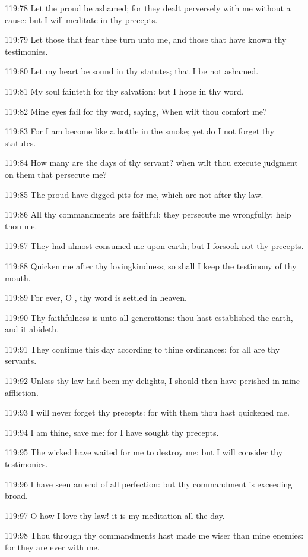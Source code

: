 119:78 Let the proud be ashamed; for they dealt perversely with me without a cause: but I will meditate in thy precepts.

119:79 Let those that fear thee turn unto me, and those that have known thy testimonies.

119:80 Let my heart be sound in thy statutes; that I be not ashamed.

119:81 My soul fainteth for thy salvation: but I hope in thy word.

119:82 Mine eyes fail for thy word, saying, When wilt thou comfort me?

119:83 For I am become like a bottle in the smoke; yet do I not forget thy statutes.

119:84 How many are the days of thy servant? when wilt thou execute judgment on them that persecute me?

119:85 The proud have digged pits for me, which are not after thy law.

119:86 All thy commandments are faithful: they persecute me wrongfully; help thou me.

119:87 They had almost consumed me upon earth; but I forsook not thy precepts.

119:88 Quicken me after thy lovingkindness; so shall I keep the testimony of thy mouth.

119:89 For ever, O \LORD, thy word is settled in heaven.

119:90 Thy faithfulness is unto all generations: thou hast established the earth, and it abideth.

119:91 They continue this day according to thine ordinances: for all are thy servants.

119:92 Unless thy law had been my delights, I should then have perished in mine affliction.

119:93 I will never forget thy precepts: for with them thou hast quickened me.

119:94 I am thine, save me: for I have sought thy precepts.

119:95 The wicked have waited for me to destroy me: but I will consider thy testimonies.

119:96 I have seen an end of all perfection: but thy commandment is exceeding broad.

119:97 O how I love thy law! it is my meditation all the day.

119:98 Thou through thy commandments hast made me wiser than mine enemies: for they are ever with me.

